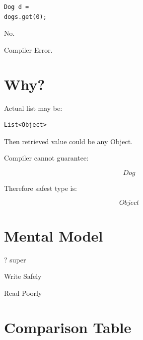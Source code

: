\documentclass[11pt,a4paper]{book}
\begin{document}
\begin{verbatim} 
Dog d =
dogs.get(0);
\end{verbatim}


No.


Compiler Error.


\section{Why?}

Actual list may be:

\begin{verbatim} 
List<Object>
\end{verbatim}


Then retrieved value could be any Object.


Compiler cannot guarantee:

\[
Dog
\]


Therefore safest type is:

\[
Object
\]


\section{Mental Model}

\begin{mentalmodel}

? super

Write Safely

Read Poorly

\end{mentalmodel}


\section{Comparison Table}
\end{document}
